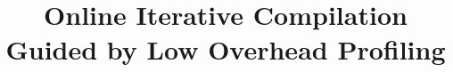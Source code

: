 \documentclass[sigplan,10pt]{acmart}
\theoremstyle{definition}
\newcommand{\IterComp}{{Iterative Compilation}}
\begin{document}
\title{Online {\IterComp}\\Guided by Low Overhead Profiling}

\author{ \vspace{1em} }
\affiliation{%
  \institution{ }
}
\email{ }







\renewcommand{\shortauthors}{R. Rocha et al.}
\end{document}
